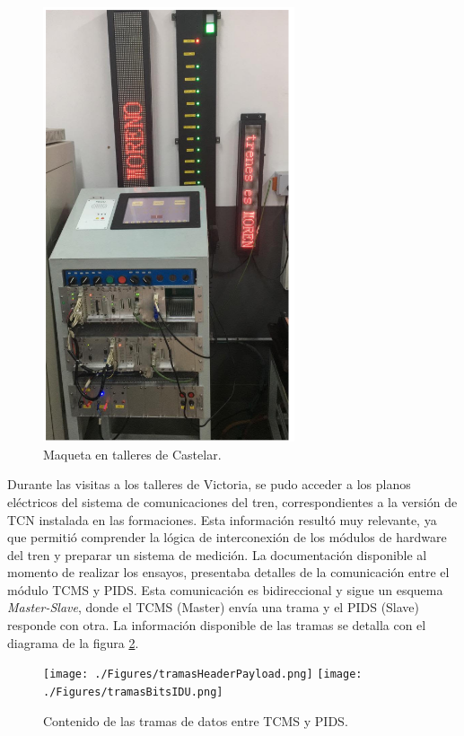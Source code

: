 \begin{figure}[H]
	\centering
	\includegraphics[width=0.66\textwidth]{./Figures/maqueta.png}
	\caption{Maqueta en talleres de Castelar.}
	\label{fig:maquetaCastelar}
\end{figure}


Durante las visitas a los talleres de Victoria, se pudo acceder a los planos eléctricos del sistema de comunicaciones del tren, correspondientes a la versión de TCN instalada en las formaciones. Esta información resultó muy relevante, ya que permitió comprender la lógica de interconexión de los módulos de hardware del tren y preparar un sistema de medición. La documentación disponible al momento de realizar los ensayos, presentaba detalles de la comunicación entre el módulo TCMS y PIDS. Esta comunicación es bidireccional y sigue un esquema \textit{Master-Slave}, donde el TCMS (Master) envía una trama y el PIDS (Slave) responde con otra. La información disponible de las tramas se detalla con el diagrama de la figura \ref{fig:tramasHeaderPayload}.

\begin{figure}[H]
	\centering
	\texttt{[image: ./Figures/tramasHeaderPayload.png]}
	\texttt{[image: ./Figures/tramasBitsIDU.png]}
	\caption{Contenido de las tramas de datos entre TCMS y PIDS.}
	\label{fig:tramasHeaderPayload}
\end{figure}

